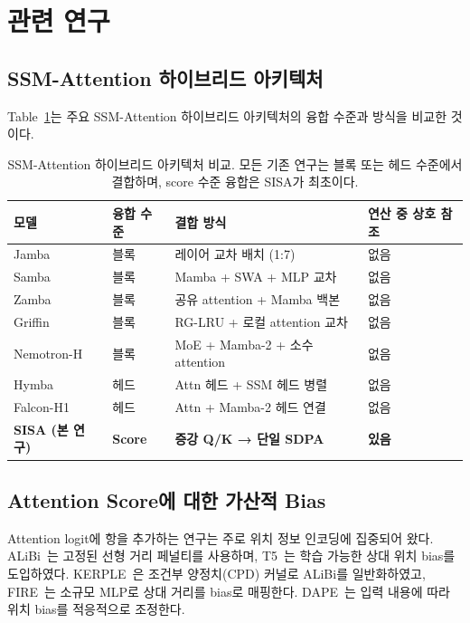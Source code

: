 \documentclass[11pt]{article}
\begin{document}
\section{관련 연구}
\label{sec:related}

\subsection{SSM-Attention 하이브리드 아키텍처}

Table~\ref{tab:related_hybrids}는 주요 SSM-Attention 하이브리드 아키텍처의 융합 수준과 방식을 비교한 것이다.

\begin{table}[h]
\centering
\small
\caption{SSM-Attention 하이브리드 아키텍처 비교. 모든 기존 연구는 블록 또는 헤드 수준에서 결합하며, score 수준 융합은 SISA가 최초이다.}
\label{tab:related_hybrids}
\begin{tabular}{llll}
\toprule
\textbf{모델} & \textbf{융합 수준} & \textbf{결합 방식} & \textbf{연산 중 상호 참조} \\
\midrule
Jamba~\citep{jamba} & 블록 & 레이어 교차 배치 (1:7) & 없음 \\
Samba~\citep{samba} & 블록 & Mamba + SWA + MLP 교차 & 없음 \\
Zamba~\citep{zamba} & 블록 & 공유 attention + Mamba 백본 & 없음 \\
Griffin~\citep{griffin} & 블록 & RG-LRU + 로컬 attention 교차 & 없음 \\
Nemotron-H~\citep{nemotron} & 블록 & MoE + Mamba-2 + 소수 attention & 없음 \\
Hymba~\citep{hymba} & 헤드 & Attn 헤드 + SSM 헤드 병렬 & 없음 \\
Falcon-H1~\citep{falconh1} & 헤드 & Attn + Mamba-2 헤드 연결 & 없음 \\
\midrule
\textbf{SISA (본 연구)} & \textbf{Score} & \textbf{증강 Q/K → 단일 SDPA} & \textbf{있음} \\
\bottomrule
\end{tabular}
\end{table}

\subsection{Attention Score에 대한 가산적 Bias}

Attention logit에 항을 추가하는 연구는 주로 위치 정보 인코딩에 집중되어 왔다. ALiBi~\citep{alibi}는 고정된 선형 거리 페널티를 사용하며, T5~\citep{raffel2020t5}는 학습 가능한 상대 위치 bias를 도입하였다. KERPLE~\citep{kerple}은 조건부 양정치(CPD) 커널로 ALiBi를 일반화하였고, FIRE~\citep{fire}는 소규모 MLP로 상대 거리를 bias로 매핑한다. DAPE~\citep{dape}는 입력 내용에 따라 위치 bias를 적응적으로 조정한다.
\end{document}

